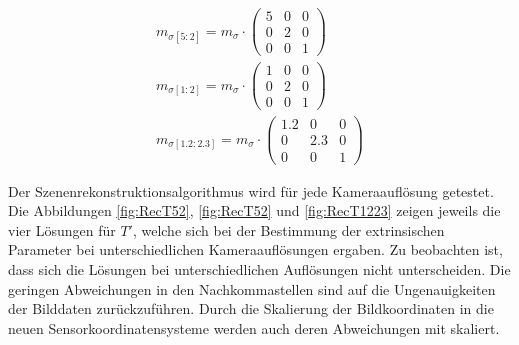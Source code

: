 \begin{gather}
	m_{\sigma[5:2]}=
m_\sigma \cdot
\begin{pmatrix}
	5&0&0\\
	0&2&0\\
	0&0&1	
\end{pmatrix}\\
	m_{\sigma[1:2]}=
m_\sigma \cdot
\begin{pmatrix}
	1&0&0\\
	0&2&0\\
	0&0&1	
\end{pmatrix}\\
	m_{\sigma[1.2:2.3]}=
m_\sigma \cdot
\begin{pmatrix}
	1.2&0&0\\
	0&2.3&0\\
	0&0&1	
\end{pmatrix}
\end{gather}


Der Szenenrekonstruktionsalgorithmus wird für jede Kameraauflösung getestet. Die Abbildungen \ref{fig:RecT52}, \ref{fig:RecT52} und \ref{fig:RecT1223} zeigen jeweils die vier Lösungen für $T'$, welche sich bei der Bestimmung der extrinsischen Parameter bei unterschiedlichen Kameraauflösungen ergaben. Zu beobachten ist, dass sich die Lösungen bei unterschiedlichen Auflösungen nicht unterscheiden. Die geringen Abweichungen in den Nachkommastellen sind auf die Ungenauigkeiten der Bilddaten zurückzuführen. Durch die Skalierung der Bildkoordinaten in die neuen Sensorkoordinatensysteme werden auch deren Abweichungen mit skaliert. 

%
%




